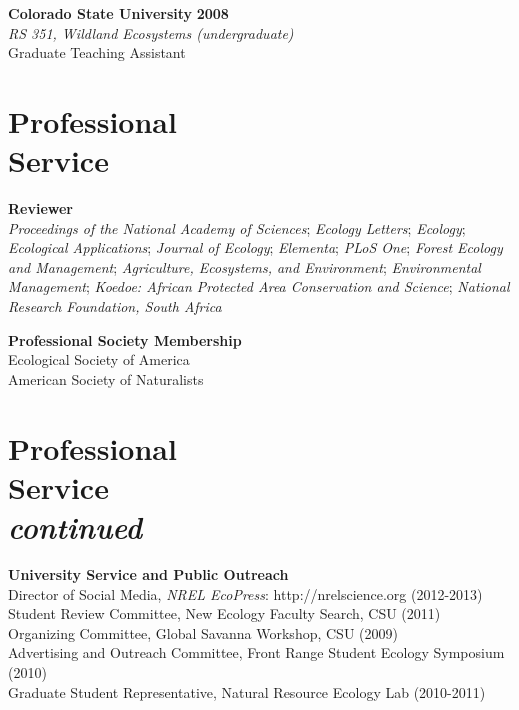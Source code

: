 \documentclass[margin,line]{resume}
\begin{document}
\begin{resume}
     \textbf{Colorado State University} \hfill \textbf{2008}\\ 
               \textsl{RS 351, Wildland Ecosystems (undergraduate)}\\
               Graduate Teaching Assistant 
    \section{\mysidestyle Professional\\Service}
    \textbf{Reviewer}\\
    	\textsl{Proceedings of the National Academy of Sciences};
	\textsl{Ecology Letters};
  \textsl{Ecology};
	\textsl{Ecological Applications};
	\textsl{Journal of Ecology};
  \textsl{Elementa};
  \textsl{PLoS One};
	\textsl{Forest Ecology and Management};
	\textsl{Agriculture, Ecosystems, and Environment};
	\textsl{Environmental Management};
	 \textsl{Koedoe: African Protected Area Conservation and Science};
	\textsl{National Research Foundation, South Africa}
	

 \textbf{Professional Society Membership}\\
    	Ecological Society of America\\
	American Society of Naturalists

\section{\mysidestyle Professional\\Service\\ \textsl{\footnotesize continued}}

   \textbf{University Service and Public Outreach}\\
   	Director of Social Media, \textsl{NREL EcoPress}: http://nrelscience.org (2012-2013)\\
	Student Review Committee, New Ecology Faculty Search, CSU (2011)\\
	Organizing Committee, Global Savanna Workshop, CSU (2009)\\
	Advertising and Outreach Committee, Front Range Student Ecology Symposium (2010)\\
	Graduate Student Representative, Natural Resource Ecology Lab (2010-2011)
  

\end{resume}
\end{document}
